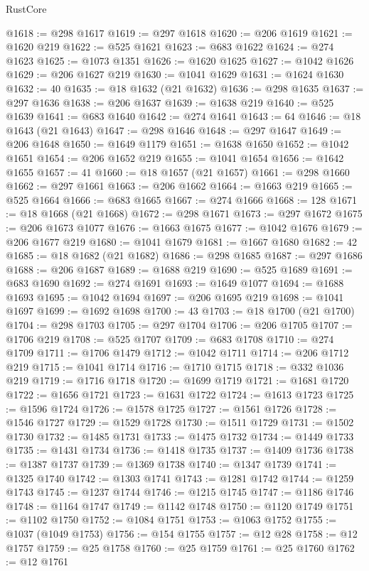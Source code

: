 \begin{lexlean}{RustCore}
\begin{coremodule}
@1618 := @298 @1617
@1619 := @297 @1618
@1620 := @206 @1619
@1621 := @1620 @219
@1622 := @525 @1621
@1623 := @683 @1622
@1624 := @274 @1623
@1625 := @1073 @1351
@1626 := @1620 @1625
@1627 := @1042 @1626
@1629 := @206 @1627 @219
@1630 := @1041 @1629
@1631 := @1624 @1630
@1632 := 40
@1635 := @18 @1632 (@21 @1632)
@1636 := @298 @1635
@1637 := @297 @1636
@1638 := @206 @1637
@1639 := @1638 @219
@1640 := @525 @1639
@1641 := @683 @1640
@1642 := @274 @1641
@1643 := 64
@1646 := @18 @1643 (@21 @1643)
@1647 := @298 @1646
@1648 := @297 @1647
@1649 := @206 @1648
@1650 := @1649 @1179
@1651 := @1638 @1650
@1652 := @1042 @1651
@1654 := @206 @1652 @219
@1655 := @1041 @1654
@1656 := @1642 @1655
@1657 := 41
@1660 := @18 @1657 (@21 @1657)
@1661 := @298 @1660
@1662 := @297 @1661
@1663 := @206 @1662
@1664 := @1663 @219
@1665 := @525 @1664
@1666 := @683 @1665
@1667 := @274 @1666
@1668 := 128
@1671 := @18 @1668 (@21 @1668)
@1672 := @298 @1671
@1673 := @297 @1672
@1675 := @206 @1673 @1077
@1676 := @1663 @1675
@1677 := @1042 @1676
@1679 := @206 @1677 @219
@1680 := @1041 @1679
@1681 := @1667 @1680
@1682 := 42
@1685 := @18 @1682 (@21 @1682)
@1686 := @298 @1685
@1687 := @297 @1686
@1688 := @206 @1687
@1689 := @1688 @219
@1690 := @525 @1689
@1691 := @683 @1690
@1692 := @274 @1691
@1693 := @1649 @1077
@1694 := @1688 @1693
@1695 := @1042 @1694
@1697 := @206 @1695 @219
@1698 := @1041 @1697
@1699 := @1692 @1698
@1700 := 43
@1703 := @18 @1700 (@21 @1700)
@1704 := @298 @1703
@1705 := @297 @1704
@1706 := @206 @1705
@1707 := @1706 @219
@1708 := @525 @1707
@1709 := @683 @1708
@1710 := @274 @1709
@1711 := @1706 @1479
@1712 := @1042 @1711
@1714 := @206 @1712 @219
@1715 := @1041 @1714
@1716 := @1710 @1715
@1718 := @332 @1036 @219
@1719 := @1716 @1718
@1720 := @1699 @1719
@1721 := @1681 @1720
@1722 := @1656 @1721
@1723 := @1631 @1722
@1724 := @1613 @1723
@1725 := @1596 @1724
@1726 := @1578 @1725
@1727 := @1561 @1726
@1728 := @1546 @1727
@1729 := @1529 @1728
@1730 := @1511 @1729
@1731 := @1502 @1730
@1732 := @1485 @1731
@1733 := @1475 @1732
@1734 := @1449 @1733
@1735 := @1431 @1734
@1736 := @1418 @1735
@1737 := @1409 @1736
@1738 := @1387 @1737
@1739 := @1369 @1738
@1740 := @1347 @1739
@1741 := @1325 @1740
@1742 := @1303 @1741
@1743 := @1281 @1742
@1744 := @1259 @1743
@1745 := @1237 @1744
@1746 := @1215 @1745
@1747 := @1186 @1746
@1748 := @1164 @1747
@1749 := @1142 @1748
@1750 := @1120 @1749
@1751 := @1102 @1750
@1752 := @1084 @1751
@1753 := @1063 @1752
@1755 := @1037 (@1049 @1753)
@1756 := @154 @1755
@1757 := @12 @28
@1758 := @12 @1757
@1759 := @25 @1758
@1760 := @25 @1759
@1761 := @25 @1760
@1762 := @12 @1761

\end{coremodule}
\end{lexlean}
